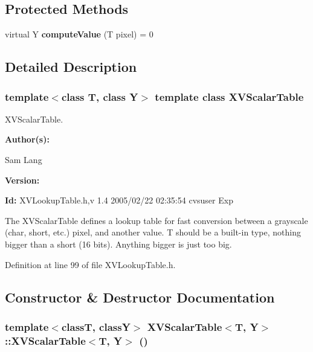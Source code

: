 \subsection*{Protected Methods}
\begin{CompactItemize}
\item 
\label{XVScalarTable_b0}
\hypertarget{class_XVScalarTable_b0}{
virtual Y {\bf compute\-Value} (T pixel) = 0}

\end{CompactItemize}


\subsection{Detailed Description}
\subsubsection*{template$<$class T, class Y$>$  template class XVScalar\-Table}

XVScalar\-Table.

\begin{Desc}
\item[{\bf Author(s): }]\par
 Sam Lang \end{Desc}
\begin{Desc}
\item[{\bf Version: }]\par
 \end{Desc}
\begin{Desc}
\item[{\bf Id: }] XVLookup\-Table.h,v 1.4 2005/02/22 02:35:54 cvsuser Exp \end{Desc}


The XVScalar\-Table defines a lookup table for fast conversion between a grayscale (char, short, etc.) pixel, and another value. T should be a built-in type, nothing bigger than a short (16 bits). Anything bigger is just too big. 



Definition at line 99 of file XVLookup\-Table.h.

\subsection{Constructor \& Destructor Documentation}
\label{XVScalarTable_a0}
\hypertarget{class_XVScalarTable_a0}{
\subsubsection[XVScalarTable]{\setlength{\rightskip}{0pt plus 5cm}template$<$classT, classY$>$ XVScalar\-Table$<$T, Y$>$::XVScalar\-Table$<$T, Y$>$ ()}}




